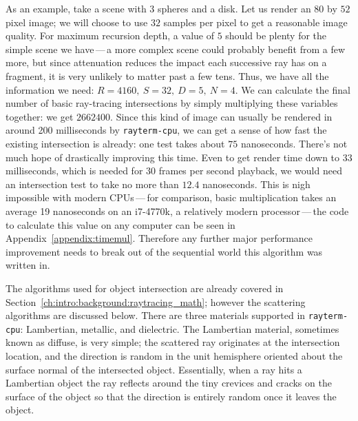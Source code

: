 As an example, take a scene with $3$ spheres and a disk.
Let us render an $80$ by $52$ pixel image;
we will choose to use $32$ samples per pixel to get a reasonable image quality.
For maximum recursion depth, a value of $5$ should be plenty for the simple scene we have\,---\,a more complex scene could probably benefit from a few more, but since attenuation reduces the impact each successive ray has on a fragment, it is very unlikely to matter past a few tens.
Thus, we have all the information we need: $R = 4160,\ S = 32,\ D = 5,\ N = 4$.
We can calculate the final number of basic ray-tracing intersections by simply multiplying these variables together: we get $2662400$.
Since this kind of image can usually be rendered in around 200 milliseconds by \texttt{rayterm-cpu}, we can get a sense of how fast the existing intersection is already: one test takes about $75$ nanoseconds.
There's not much hope of drastically improving this time.
Even to get render time down to $33$ milliseconds, which is needed for $30$ frames per second playback, we would need an intersection test to take no more than $12.4$ nanoseconds.
This is nigh impossible with modern CPUs\,---\,for comparison, basic multiplication takes an average 19 nanoseconds on an i7-4770k, a relatively modern processor\,---\,the code to calculate this value on any computer can be seen in Appendix~\ref{appendix:timemul}.
Therefore any further major performance improvement needs to break out of the sequential world this algorithm was written in.

The algorithms used for object intersection are already covered in Section~\ref{ch:intro:background:raytracing_math}; however the scattering algorithms are discussed below.
There are three materials supported in \texttt{rayterm-cpu}: Lambertian, metallic, and dielectric.
The Lambertian material, sometimes known as diffuse, is very simple; the scattered ray originates at the intersection location, and the direction is random in the unit hemisphere oriented about the surface normal of the intersected object.
Essentially, when a ray hits a Lambertian object the ray reflects around the tiny crevices and cracks on the surface of the object so that the direction is entirely random once it leaves the object.


